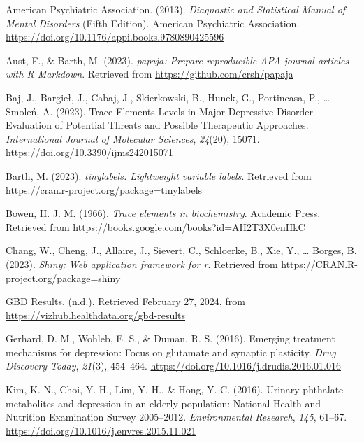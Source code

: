 \documentclass[
  man,floatsintext]{apa6}
\newlength{\cslhangindent}
\newlength{\cslentryspacingunit} %
\newenvironment{CSLReferences}[2] %
 {%
  \setlength{\parindent}{0pt}
  \ifodd #1
  \let\oldpar\par
  \def\par{\hangindent=\cslhangindent\oldpar}
  \fi
  \setlength{\parskip}{#2\cslentryspacingunit}
 }%
 {}
\begin{document}
\hypertarget{refs}{}
\begin{CSLReferences}{1}{0}
\leavevmode{}%
American Psychiatric Association. (2013). \emph{Diagnostic and {Statistical Manual} of {Mental Disorders}} (Fifth Edition). {American Psychiatric Association}. \url{https://doi.org/10.1176/appi.books.9780890425596}

\leavevmode{}%
Aust, F., \& Barth, M. (2023). \emph{{papaja}: {Prepare} reproducible {APA} journal articles with {R Markdown}}. Retrieved from \url{https://github.com/crsh/papaja}

\leavevmode{}%
Baj, J., Bargieł, J., Cabaj, J., Skierkowski, B., Hunek, G., Portincasa, P., \ldots{} Smoleń, A. (2023). Trace {Elements Levels} in {Major Depressive Disorder}---{Evaluation} of {Potential Threats} and {Possible Therapeutic Approaches}. \emph{International Journal of Molecular Sciences}, \emph{24}(20), 15071. \url{https://doi.org/10.3390/ijms242015071}

\leavevmode{}%
Barth, M. (2023). \emph{{tinylabels}: Lightweight variable labels}. Retrieved from \url{https://cran.r-project.org/package=tinylabels}

\leavevmode{}%
Bowen, H. J. M. (1966). \emph{Trace elements in biochemistry}. {Academic Press}. Retrieved from \url{https://books.google.com/books?id=AH2T3X0enHkC}

\leavevmode{}%
Chang, W., Cheng, J., Allaire, J., Sievert, C., Schloerke, B., Xie, Y., \ldots{} Borges, B. (2023). \emph{Shiny: Web application framework for r}. Retrieved from \url{https://CRAN.R-project.org/package=shiny}

\leavevmode{}%
{GBD Results}. (n.d.). Retrieved February 27, 2024, from \url{https://vizhub.healthdata.org/gbd-results}

\leavevmode{}%
Gerhard, D. M., Wohleb, E. S., \& Duman, R. S. (2016). Emerging treatment mechanisms for depression: Focus on glutamate and synaptic plasticity. \emph{Drug Discovery Today}, \emph{21}(3), 454--464. \url{https://doi.org/10.1016/j.drudis.2016.01.016}

\leavevmode{}%
Kim, K.-N., Choi, Y.-H., Lim, Y.-H., \& Hong, Y.-C. (2016). Urinary phthalate metabolites and depression in an elderly population: {National Health} and {Nutrition Examination Survey} 2005--2012. \emph{Environmental Research}, \emph{145}, 61--67. \url{https://doi.org/10.1016/j.envres.2015.11.021}


\end{CSLReferences}
\end{document}

